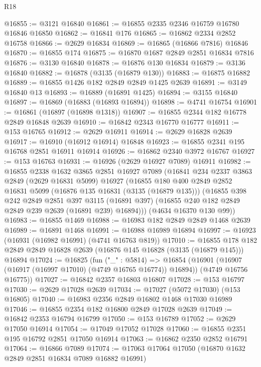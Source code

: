 \begin{lexlean}{R18}
\begin{coremodule}
@16855 := @3121 @16840
@16861 := @16855 @2335 @2346 @16759 @16780 @16846 @16850
@16862 := @16841 @176
@16865 := @16862 @2334 @2852 @16758
@16866 := @2629 @16834
@16869 := @16865 (@16866 @7816) @16846
@16870 := @16855 @174
@16875 := @16870 @1687 @2849 @2851 @16834 @7816
@16876 := @3130 @16840
@16878 := @16876 @130 @16834
@16879 := @3136 @16840
@16882 := @16878 (@3135 (@16879 @130))
@16883 := @16875 @16882
@16889 := @16855 @1426 @182 @2849 @2849 @1425 @2639
@16891 := @3149 @16840 @13
@16893 := @16889 (@16891 @1425)
@16894 := @3155 @16840
@16897 := @16869 (@16883 (@16893 @16894))
@16898 := @4741 @16754
@16901 := @16861 (@16897 (@16898 @1318))
@16907 := @16855 @2344 @182 @16778 @2849 @16848 @2639
@16910 := @16842 @2343 @16770 @16777
@16911 := @153 @16765
@16912 := @2629 @16911
@16914 := @2629 @16828 @2639
@16917 := @16910 (@16912 @16914) @16848
@16923 := @16855 @2341 @195 @16768 @2851 @16911 @16914
@16926 := @16862 @2340 @3972 @16767
@16927 := @153 @16763
@16931 := @16926 (@2629 @16927 @7089) @16911
@16982 := @16855
    @2338
    @1632
    @3865
    @2851
    @16927
    @7089
    (@16841
      @234
      @2337
      @3863
      @2849
      (@2629 @16831 @5099)
      @16927
      (@16855
        @180
        @400
        @2849
        @2852
        @16831
        @5099
        (@16876 @135 @16831 (@3135 (@16879 @135)))
        (@16855
          @398
          @242
          @2849
          @2851
          @397
          @3115
          (@16891 @397)
          (@16855 @240 @182 @2849 @2849 @239 @2639 (@16891 @239) @16894)))
      (@4634 @16370 @130 @99))
@16983 := @16855 @1469
@16988 := @16983 @182 @2849 @2849 @1468 @2639
@16989 := @16891 @1468
@16991 := @16988 @16989 @16894
@16997 := @16923 (@16931 (@16982 @16991) (@4741 @16763 @819))
@17010 := @16855
    @178
    @182
    @2849
    @2849
    @16828
    @2639
    (@16876 @145 @16828 (@3135 (@16879 @145)))
    @16894
@17024 := @16825
    (fun ("_" : @5814) =>
    @16854
      (@16901 (@16907 (@16917 (@16997 @17010) (@4749 @16765 @16774)) @16894))
      (@4749 @16756 @16775))
@17027 := @16842 @2357 @16803 @16807
@17028 := @153 @16797
@17030 := @2629 @17028 @2639
@17034 := @17027 (@5072 @17030) (@153 @16805)
@17040 := @16983 @2356 @2849 @16802 @1468 @17030 @16989
@17046 := @16855 @2354 @182 @16800 @2849 @17028 @2639
@17049 := @16842 @2353 @16794 @16799
@17050 := @153 @16789
@17052 := @2629 @17050 @16914
@17054 := @17049 @17052 @17028
@17060 := @16855 @2351 @195 @16792 @2851 @17050 @16914
@17063 := @16862 @2350 @2852 @16791
@17064 := @16866 @7089
@17074 := @17063 @17064 @17050 (@16870 @1632 @2849 @2851 @16834 @7089 @16882 @16991)

\end{coremodule}
\end{lexlean}
